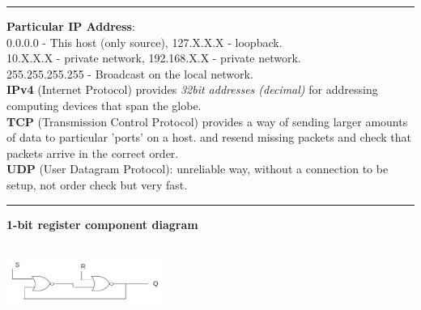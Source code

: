 \documentclass[8pt,a4paper,landscape]{article}
\begin{document}
\begin{spacing}{-1}
\begin{multicols*}{3}
\hrule \noindent
\textbf{Particular IP Address}: \\
0.0.0.0 - This host (only source), 127.X.X.X - loopback. \\
10.X.X.X - private network, 192.168.X.X - private network. \\
255.255.255.255 - Broadcast on the local network. \\
\textbf{IPv4} (Internet Protocol) provides \textit{32bit addresses (decimal)} for addressing computing devices that span the globe. \\
\textbf{TCP} (Transmission Control Protocol) provides a way of sending larger amounts of data to particular 'ports' on a host.
and resend missing packets and check that packets arrive in the correct order. \\
\textbf{UDP} (User Datagram Protocol): unreliable way, without a connection to be setup, not order check but very fast. \\


\hrule \noindent
\textbf{1-bit register component diagram}
\begin{center}
    \includegraphics[width=2in,height=1in]{./flip-flop.png} \\
\end{center}

\end{multicols*}
\end{spacing}
\end{document}
